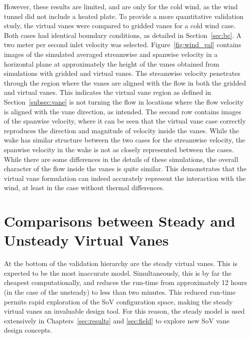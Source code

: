 %
%
%
However, these results are limited, and are
only for the cold wind, as the wind tunnel did not include a heated plate.
To provide a more quantitative validation study, the virtual vanes were
compared to gridded vanes for a cold wind case. Both cases had identical
boundary conditions, as detailed in Section~\ref{sec:bc}. A two meter
per second inlet velocity was selected. Figure~\ref{fig:wind_val}
contains images of the simulated averaged 
streamwise and  spanwise velocity in a horizontal plane at approximately
the height of the vanes obtained from simulations with gridded and
virtual vanes. 
The streamwise velocity penetrates through the region where the vanes
are aligned with the flow in both the gridded and virtual vanes. This
indicates the virtual vane region as defined in
Section~\ref{subsec:vane} is not turning the flow in locations where
the flow velocity is aligned with the vane direction, as intended. 
The second row contains images of the spanwise velocity, where it can be
seen that the virtual vane case correctly reproduces the direction and
magnitude of velocity inside the vanes. While the wake has similar
structure between the two cases for the streamwise velocity, the
spanwise velocity in the wake is not as closely represented between the
cases. While there are some differences in the
details of these simulations, the overall character of the flow
inside the vanes is quite similar. This demonstrates that the virtual
vane formulation can indeed accurately represent the interaction with the wind, 
at least in the case without thermal differences.  

\section{Comparisons between Steady and Unsteady Virtual Vanes}
\label{sec:steady_val}

At the bottom of the validation hierarchy are the steady virtual
vanes. This is expected to be the most inaccurate model. 
Simultaneously, this is by far the cheapest computationally, and 
reduces the run-time from approximately 12 hours (in the case of the
unsteady) to less than two minutes. This reduced run-time permits
rapid exploration of the SoV configuration space, making the steady
virtual vanes an invaluable design tool. For this reason, the steady
model is used extensively in Chapters~\ref{sec:results} and
\ref{sec:field} to explore new SoV vane design concepts. 

